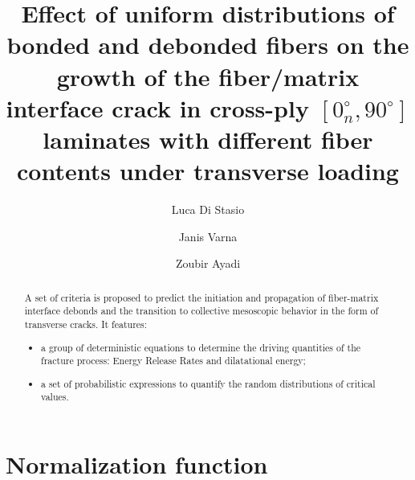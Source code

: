 \documentclass[review]{elsarticle}
\begin{document}
\begin{frontmatter}

\title{Effect of uniform distributions of bonded and debonded fibers on the growth of the fiber/matrix interface crack in cross-ply $\left[0^{\circ}_{n},90^{\circ}\right]$ laminates with different fiber contents under transverse loading}


\author[nancy,lulea]{Luca Di Stasio}
\author[lulea]{Janis Varna}
\author[nancy]{Zoubir Ayadi}


\address[nancy]{Universit\'e de Lorraine, EEIGM, IJL, 6 Rue Bastien Lepage, F-54010 Nancy, France}
\address[lulea]{Lule\aa\ University of Technology, University Campus, SE-97187 Lule\aa, Sweden}

\begin{abstract}
A set of criteria is proposed to predict the initiation and propagation of fiber-matrix interface debonds and the transition to collective mesoscopic behavior in the form of transverse cracks. It features:
\begin{itemize}
\item a group of deterministic equations to determine the driving quantities of the fracture process: Energy Release Rates and dilatational energy;
\item a set of probabilistic expressions to quantify the random distributions of critical values.
\end{itemize}
\end{abstract}


\end{frontmatter}

\linenumbers

\section{Normalization function}
\end{document}

